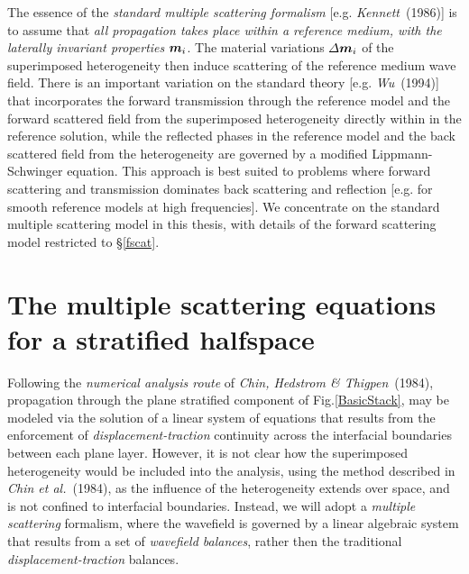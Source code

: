 The essence of the {\em standard  multiple scattering formalism\/} [e.g. 
{\em Kennett}~(1986)] is to assume 
that {\em all propagation takes place within a reference medium, with 
the laterally invariant properties\/} ${\mbox{\boldmath$\mit m$\unboldmath}}_{i}$. The 
material variations ${\mit \Delta}{\mbox{\boldmath$\mit m$\unboldmath}}_{i}$ of the superimposed heterogeneity 
then induce scattering of the reference medium wave field. There is an 
important variation on the standard theory [e.g. {\em Wu\/}~(1994)]
 that incorporates the forward 
transmission through the reference model and the forward scattered field
from the superimposed heterogeneity directly within in the reference solution, while the 
reflected phases in the reference model and the back scattered field from 
the heterogeneity are governed by a modified Lippmann-Schwinger equation. 
This approach is best suited to problems where forward scattering and 
transmission dominates back scattering and reflection [e.g. for smooth 
reference models at high frequencies]. We concentrate on the standard 
multiple scattering model in this thesis, with details of the forward 
scattering model restricted to \S\ref{fscat}. 

\section[The multiple scattering equations]
{The multiple scattering equations for a stratified halfspace} \label{RTfactor}

Following the  {\em numerical analysis route\/} of {\em Chin, Hedstrom \& 
Thigpen\/}~(1984), propagation through 
the plane stratified component of Fig.\ref{BasicStack}, may be modeled 
via the solution of a linear system of equations that results from the 
enforcement of {\em displacement-traction\/} continuity across the interfacial
boundaries between each plane layer. However, it is not clear how the 
superimposed heterogeneity would be included into the analysis, using the 
method described in {\em Chin et al.\/}~(1984), as the influence of the 
heterogeneity extends over space, and is not confined to interfacial 
boundaries. Instead, we will adopt a {\em multiple scattering\/} 
formalism, where the wavefield is governed by a linear algebraic system that results from 
a set of {\em wavefield balances\/}, rather then the traditional  {\em displacement-traction\/}
balances. 



